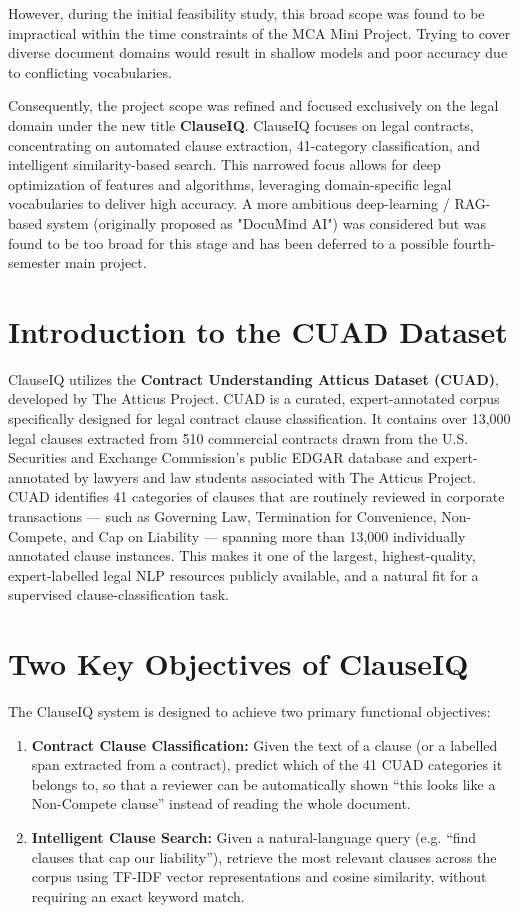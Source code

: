 \documentclass[12pt, a4paper]{report}
\begin{document}
However, during the initial feasibility study, this broad scope was found to be impractical within the time constraints of the MCA Mini Project. Trying to cover diverse document domains would result in shallow models and poor accuracy due to conflicting vocabularies. 

Consequently, the project scope was refined and focused exclusively on the legal domain under the new title \textbf{ClauseIQ}. ClauseIQ focuses on legal contracts, concentrating on automated clause extraction, 41-category classification, and intelligent similarity-based search. This narrowed focus allows for deep optimization of features and algorithms, leveraging domain-specific legal vocabularies to deliver high accuracy. A more ambitious deep-learning / RAG-based system (originally proposed as "DocuMind AI") was considered but was found to be too broad for this stage and has been deferred to a possible fourth-semester main project.

\section{Introduction to the CUAD Dataset}
ClauseIQ utilizes the \textbf{Contract Understanding Atticus Dataset (CUAD)}, developed by The Atticus Project. CUAD is a curated, expert-annotated corpus specifically designed for legal contract clause classification. It contains over 13,000 legal clauses extracted from 510 commercial contracts drawn from the U.S. Securities and Exchange Commission's public EDGAR database and expert-annotated by lawyers and law students associated with The Atticus Project. CUAD identifies 41 categories of clauses that are routinely reviewed in corporate transactions — such as Governing Law, Termination for Convenience, Non-Compete, and Cap on Liability — spanning more than 13,000 individually annotated clause instances. This makes it one of the largest, highest-quality, expert-labelled legal NLP resources publicly available, and a natural fit for a supervised clause-classification task.

\section{Two Key Objectives of ClauseIQ}
The ClauseIQ system is designed to achieve two primary functional objectives:
\begin{enumerate}
    \item \textbf{Contract Clause Classification:} Given the text of a clause (or a labelled span extracted from a contract), predict which of the 41 CUAD categories it belongs to, so that a reviewer can be automatically shown ``this looks like a Non-Compete clause'' instead of reading the whole document.
    \item \textbf{Intelligent Clause Search:} Given a natural-language query (e.g. ``find clauses that cap our liability''), retrieve the most relevant clauses across the corpus using TF-IDF vector representations and cosine similarity, without requiring an exact keyword match.
\end{enumerate}
\end{document}

